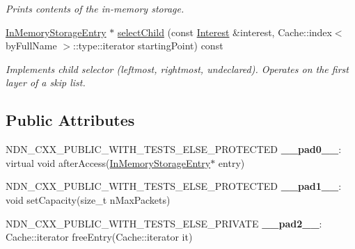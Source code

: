 \begin{DoxyCompactItemize}
\begin{DoxyCompactList}\small\item\em Prints contents of the in-\/memory storage. \end{DoxyCompactList}\item 
\hyperlink{classndn_1_1util_1_1InMemoryStorageEntry}{In\+Memory\+Storage\+Entry} $\ast$ \hyperlink{classndn_1_1util_1_1InMemoryStorage_aacccfb8d0e83f851c568e2b1d5b1199c}{select\+Child} (const \hyperlink{classndn_1_1Interest}{Interest} \&interest, Cache\+::index$<$ by\+Full\+Name $>$\+::type\+::iterator starting\+Point) const
\begin{DoxyCompactList}\small\item\em Implements child selector (leftmost, rightmost, undeclared). Operates on the first layer of a skip list. \end{DoxyCompactList}\end{DoxyCompactItemize}
\subsection*{Public Attributes}
\begin{DoxyCompactItemize}
\item 
N\+D\+N\+\_\+\+C\+X\+X\+\_\+\+P\+U\+B\+L\+I\+C\+\_\+\+W\+I\+T\+H\+\_\+\+T\+E\+S\+T\+S\+\_\+\+E\+L\+S\+E\+\_\+\+P\+R\+O\+T\+E\+C\+T\+ED {\bfseries \+\_\+\+\_\+pad0\+\_\+\+\_\+}\+: virtual void after\+Access(\hyperlink{classndn_1_1util_1_1InMemoryStorageEntry}{In\+Memory\+Storage\+Entry}$\ast$ entry)\hypertarget{classndn_1_1util_1_1InMemoryStorage_a57be134342392b26f529927330da6107}{}\label{classndn_1_1util_1_1InMemoryStorage_a57be134342392b26f529927330da6107}

\item 
N\+D\+N\+\_\+\+C\+X\+X\+\_\+\+P\+U\+B\+L\+I\+C\+\_\+\+W\+I\+T\+H\+\_\+\+T\+E\+S\+T\+S\+\_\+\+E\+L\+S\+E\+\_\+\+P\+R\+O\+T\+E\+C\+T\+ED {\bfseries \+\_\+\+\_\+pad1\+\_\+\+\_\+}\+: void set\+Capacity(size\+\_\+t n\+Max\+Packets)\hypertarget{classndn_1_1util_1_1InMemoryStorage_a9b85403e56540d47c368fd67e08aeb52}{}\label{classndn_1_1util_1_1InMemoryStorage_a9b85403e56540d47c368fd67e08aeb52}

\item 
N\+D\+N\+\_\+\+C\+X\+X\+\_\+\+P\+U\+B\+L\+I\+C\+\_\+\+W\+I\+T\+H\+\_\+\+T\+E\+S\+T\+S\+\_\+\+E\+L\+S\+E\+\_\+\+P\+R\+I\+V\+A\+TE {\bfseries \+\_\+\+\_\+pad2\+\_\+\+\_\+}\+: Cache\+::iterator free\+Entry(Cache\+::iterator it)\hypertarget{classndn_1_1util_1_1InMemoryStorage_ab5476626248fec17d7f16aa24f1fdb32}{}\label{classndn_1_1util_1_1InMemoryStorage_ab5476626248fec17d7f16aa24f1fdb32}

\end{DoxyCompactItemize}


